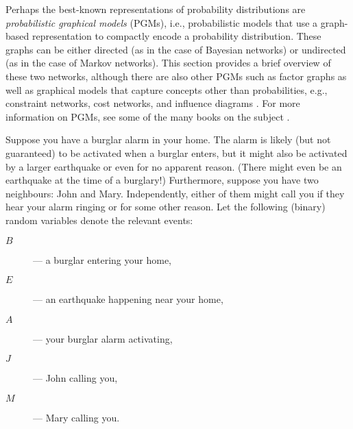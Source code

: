 Perhaps the best-known representations of probability distributions are \emph{probabilistic graphical models} (PGMs), i.e., probabilistic models that use a graph-based representation to compactly encode a probability distribution. These graphs can be either directed (as in the case of Bayesian networks) or undirected (as in the case of Markov networks). This section provides a brief overview of these two networks, although there are also other PGMs such as factor graphs \citep{DBLP:journals/spm/Loeliger04,DBLP:series/synthesis/2016Raedt} as well as graphical models that capture concepts other than probabilities, e.g., constraint networks, cost networks, and influence diagrams \citep{DBLP:series/synthesis/2019Dechter}. For more information on PGMs, see some of the many books on the subject \citep{DBLP:series/synthesis/2019Dechter,DBLP:books/daglib/0023091,DBLP:books/daglib/0066829}.

\begin{example} \label{example:bn}
  Suppose you have a burglar alarm in your home. The alarm is likely (but not guaranteed) to be activated when a burglar enters, but it might also be activated by a larger earthquake or even for no apparent reason. (There might even be an earthquake at the time of a burglary!) Furthermore, suppose you have two neighbours: John and Mary. Independently, either of them might call you if they hear your alarm ringing or for some other reason. Let the following (binary) random variables denote the relevant events:
  \begin{description}
  \item[$B$]--- a burglar entering your home,
  \item[$E$]--- an earthquake happening near your home,
  \item[$A$]--- your burglar alarm activating,
  \item[$J$]--- John calling you,
  \item[$M$]--- Mary calling you.
  \end{description}
\end{example}

